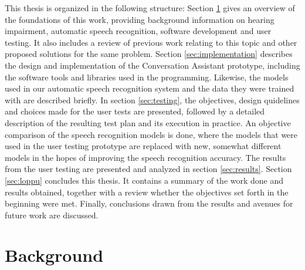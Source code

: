 \documentclass[english, 12pt, a4paper, pdftex, elec, utf8]{aaltothesis}
\begin{document}
This thesis is organized in the following structure: Section \ref{sec:tausta} gives an overview of the foundations of this work, providing background information on hearing impairment, automatic speech recognition, software development and user testing. It also includes a review of previous work relating to this topic and other proposed solutions for the same problem. Section \ref{sec:implementation} describes the design and implementation of the Conversation Assistant prototype, including the software tools and libraries used in the programming. Likewise, the models used in our automatic speech recognition system and the data they were trained with are described briefly. In section \ref{sec:testing}, the objectives, design quidelines and choices made for the user tests are presented, followed by a detailed description of the resulting test plan and its execution in practice. An objective comparison of the speech recognition models is done, where the models that were used in the user testing prototype are replaced with new, somewhat different models in the hopes of improving the speech recognition accuracy. The results from the user testing are presented and analyzed in section \ref{sec:results}. Section \ref{sec:loppu} concludes this thesis. It contains a summary of the work done and results obtained, together with a review whether the objectives set forth in the beginning were met. Finally, conclusions drawn from the results and avenues for future work are discussed.

\clearpage

\section{Background} \label{sec:tausta}
\end{document}
